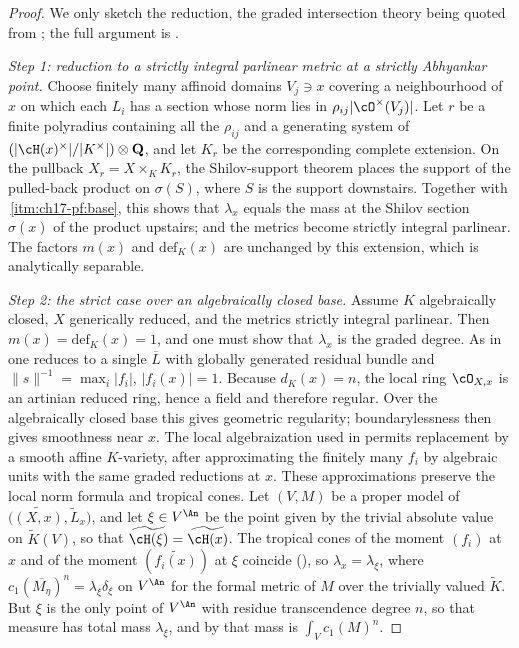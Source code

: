 \begin{proof}
We only sketch the reduction, the graded intersection theory being quoted
from ; the full argument is
\cite[Proposition~18.4.5 and Theorem~18.4.7]{CLD25}.

\emph{Step 1: reduction to a strictly integral parlinear metric at a
strictly Abhyankar point.}  Choose finitely many affinoid domains
$V_j\ni x$ covering a neighbourhood of $x$ on which each $L_i$ has a
section whose norm lies in $\rho_{ij}|\cO^\times(V_j)|$.  Let $r$ be a
finite polyradius containing all the $\rho_{ij}$ and a generating system
of $(|\cH(x)^\times|/|K^\times|)\otimes\mathbf Q$, and let $K_r$ be the
corresponding complete extension.  On the pullback $X_r=X\times_KK_r$,
the Shilov-support theorem \cite[Proposition~16.8.2]{CLD25}
places the support of the pulled-back product on $\sigma(S)$, where
$S$ is the support downstairs.  Together with
\,\cref{itm:ch17-pf:base}, this shows
that $\lambda_x$ equals the mass at the Shilov section $\sigma(x)$ of
the product upstairs; and the metrics become strictly integral parlinear.  The
factors $m(x)$ and $\mathrm{def}_K(x)$ are unchanged by this extension,
which is analytically separable.

\emph{Step 2: the strict case over an algebraically closed base.}  Assume
$K$ algebraically closed, $X$ generically reduced, and the metrics
strictly integral parlinear.  Then $m(x)=\mathrm{def}_K(x)=1$, and one
must show that $\lambda_x$ is the graded degree.  As in
 one reduces to a single $\overline L$ with
globally generated residual bundle and
$\|s\|^{-1}=\max_i|f_i|$, $|f_i(x)|=1$.  Because $d_K(x)=n$, the local
ring $\cO_{X,x}$ is an artinian reduced ring, hence a field and therefore regular.  Over the algebraically closed
base this gives geometric regularity; boundarylessness then gives
smoothness near $x$.  The local algebraization used in
\cite[Proposition~18.4.5]{CLD25} permits replacement by a smooth
affine $K$-variety, after approximating the finitely many $f_i$ by
algebraic units with the same graded reductions at $x$.  These
approximations preserve the local norm formula and tropical cones.  Let $(V,M)$ be a
proper model of $\bigl(\widetilde{(X,x)},\widetilde L_x\bigr)$, and let
$\xi\in V^{\An}$ be the point given by the trivial absolute value on
$\widetilde K(V)$, so that $\widetilde{\cH(\xi)}=\widetilde{\cH(x)}$.
The tropical cones of the moment $(f_i)$ at $x$ and of the moment
$(\widetilde{f_i(x)})$ at $\xi$ coincide
(), so $\lambda_x=\lambda_\xi$, where
$c_1(\overline{M_\eta})^n=\lambda_\xi\delta_\xi$ on $V^{\An}$ for the
formal metric of $M$ over the trivially valued $\widetilde K$.  But
$\xi$ is the only point of $V^{\An}$ with residue transcendence degree
$n$, so that measure has total mass $\lambda_\xi$, and by
 that mass is $\int_Vc_1(M)^n$.


\end{proof}
